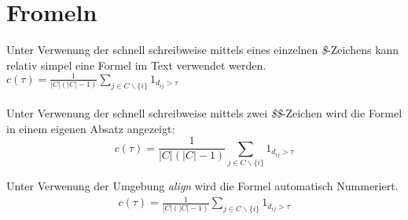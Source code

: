 
\chapter{Fromeln}
Unter Verwenung der schnell schreibweise mittels eines einzelnen \emph{\$}-Zeichens kann relativ simpel eine Formel im Text verwendet werden.
$ c(\tau) =\frac{1}{|C|(|C|-1)} \sum_{j \in C\backslash \{i\}}1_{d_{ij}>\tau}$\\\\
Unter Verwenung der schnell schreibweise mittels zwei \emph{\$\$}-Zeichen wird die Formel in einem eigenen Absatz angezeigt:
$$ c(\tau) =\frac{1}{|C|(|C|-1)} \sum_{j \in C\backslash \{i\}}1_{d_{ij}>\tau}$$

Unter Verwenung der Umgebung \emph{align} wird die Formel automatisch Nummeriert.
\begin{align}
    c(\tau) =\frac{1}{|C|(|C|-1)} \sum_{j \in C\backslash \{i\}}1_{d_{ij}>\tau}
\end{align}